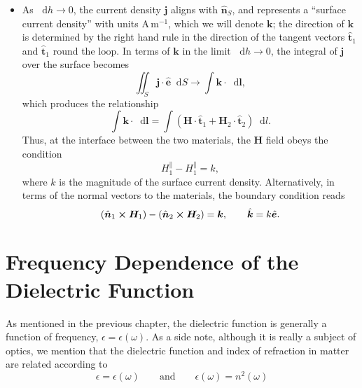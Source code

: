\documentclass[11pt, a4paper]{article}
\newcommand{\diff}{\mathop{}\!\mathrm{d}} %
\renewcommand{\vec}[1]{\bm{#1}} %
\newcommand{\uvec}[1]{\hat{\vec{#1}}} %
\renewcommand{\H}{\vec{H}}  %
\renewcommand{\j}{\vec{j}}  %
\begin{document}
\begin{itemize}
    \item As $ \diff h \to 0 $, the current density $ \j $ aligns with $ \uvec{n}_{S} $, and represents a ``surface current density'' with units $ \si{\ampere \, \meter^{-1}} $, which we will denote $ \vec{k} $; the direction of $ \vec{k} $ is determined by the right hand rule in the direction of the tangent vectors $ \uvec{t}_{1} $ and $ \uvec{t}_{1} $ round the loop. In terms of $ \vec{k} $ in the limit $ \diff h \to 0 $, the integral of $ \j $ over the surface becomes
    \begin{equation*}
        \iint_{S} \j \cdot \uvec{e} \diff S \to \int \vec{k} \cdot \diff \vec{l},
    \end{equation*}
    which produces the relationship
    \begin{equation*}
        \int \vec{k} \cdot \diff \vec{l} = \int (\H \cdot \uvec{t}_{1} + \H_{2}\cdot \uvec{t}_{2}) \diff l.
    \end{equation*}
    Thus, at the interface between the two materials, the $ \H $ field obeys the condition 
	\begin{equation*}
        H_{1}^{\parallel} - H_{1}^{\parallel} = k,
	\end{equation*}
    where $ k $ is the magnitude of the surface current density. Alternatively, in terms of the normal vectors to the materials, the boundary condition reads
	\begin{equation*}
        (\uvec{n}_{1} \cross \H_{1}) - (\uvec{n}_{2}\cross \H_{2}) = \vec{k}, \qquad \uvec{k} = k \uvec{e}.
	\end{equation*}
\end{itemize}

\newpage
\section{Frequency Dependence of the Dielectric Function}
As mentioned in the previous chapter, the dielectric function is generally a function of frequency, $ \epsilon = \epsilon(\omega) $. As a side note, although it is really a subject of optics, we mention that the dielectric function and index of refraction in matter are related according to
\begin{equation*}
    \epsilon = \epsilon(\omega) \qquad \text{and} \qquad \epsilon(\omega) = n^{2}(\omega)
\end{equation*}

    
\end{document}
